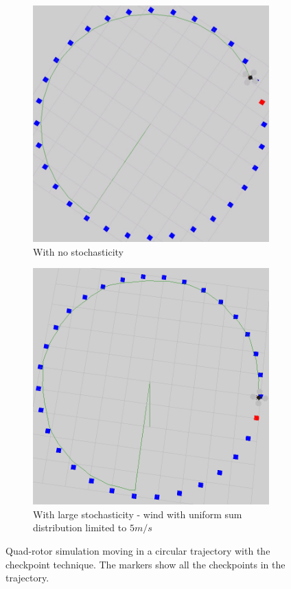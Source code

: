 \documentclass[hidelinks,BTech]{iitmdiss}
\begin{document}
\begin{figure}[H]
  \centering
  \begin{subfigure}[t]{0.45\textwidth}
    \centering
      \includegraphics[width=\textwidth]{checkpoint_circle.png}
      \caption{With no stochasticity}
  \end{subfigure}
  \begin{subfigure}[t]{0.45\textwidth}
    \centering
      \includegraphics[width=\textwidth]{checkpoint_circle_wind.png}
      \caption{With large stochasticity - wind with uniform sum distribution limited to $5 m/s$}
  \end{subfigure}
  \caption{Quad-rotor simulation moving in a circular trajectory with the checkpoint technique. The markers show all the checkpoints in the trajectory.}
\end{figure}
\end{document}
